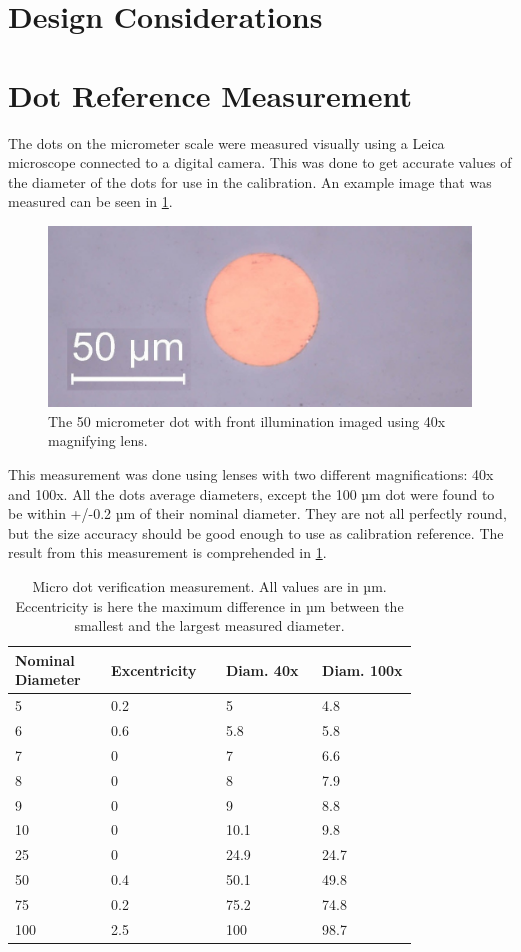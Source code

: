 \section{Design Considerations}

\section{Dot Reference Measurement}
The dots on the micrometer scale were measured visually using a Leica microscope connected to a digital camera. This was done to get accurate values of the diameter of the dots for use in the calibration. An example image that was measured can be seen in \cref{fig:50umdot40x}.

\begin{figure}[ht]
\centering\includegraphics[width=0.75\linewidth]{./figures/50umdot40x.jpg}
\caption{The 50 micrometer dot with front illumination imaged using 40x magnifying lens.}
\label{fig:50umdot40x}
\end{figure}

This measurement was done using lenses with two different magnifications: 40x and 100x. All the dots average diameters, except the 100 µm dot were found to be within +/-0.2 µm of their nominal diameter. They are not all perfectly round, but the size accuracy should be good enough to use as calibration reference. The result from this measurement is comprehended in \cref{tab:ref_meas}.

\begin{table}[ht]
\centering
\begin{tabular}{p{0.2\linewidth} p{0.2\linewidth} p{0.2\linewidth} p{0.2\linewidth}}
\hline
\textbf{Nominal Diameter} & \textbf{Excentricity} & \textbf{Diam. 40x} & \textbf{Diam. 100x} \\
\hline
5 & 0.2 & 5 & 4.8 \\
6 & 0.6 & 5.8 & 5.8 \\
7 & 0 & 7 & 6.6 \\
8 & 0 & 8 & 7.9 \\
9 & 0 & 9 & 8.8 \\
10 & 0 & 10.1 & 9.8 \\
25 & 0 & 24.9 & 24.7 \\
50 & 0.4 & 50.1 & 49.8 \\
75 & 0.2 & 75.2 & 74.8 \\
100 & 2.5 & 100 & 98.7 \\
\hline
\end{tabular}
\caption{Micro dot verification measurement. All values are in µm. Eccentricity is here the maximum difference in µm between the smallest and the largest measured diameter.}
\label{tab:ref_meas}
\end{table}


